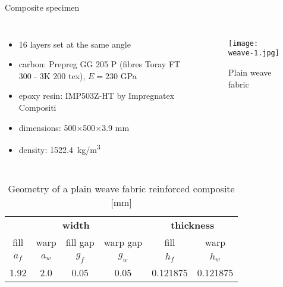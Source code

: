\documentclass[10pt,aspectratio=169,dvipsnames]{beamer} %
\newcounter{angle}
\begin{document}
	\begin{frame}[t]{Composite specimen}
		\begin{columns}[T]
			{\small
				\begin{itemize}
					\item 16 layers set at the same angle \\
					\item carbon: Prepreg GG 205 P (fibres Toray FT 300 - 3K 200 tex), $E=230$ GPa
					\item epoxy resin: IMP503Z-HT by Impregnatex Compositi 
					\item dimensions: 500$\times$500$\times$3.9 mm\\
					\item density: 1522.4~kg/m\textsuperscript{3}
				\end{itemize}
			}
			\begin{figure}
				\texttt{[image: weave-1.jpg]}
				\caption{Plain weave fabric}
			\end{figure}
		\end{columns}
		\begin{table}[h]
			\renewcommand{\arraystretch}{1.1}
			\centering \footnotesize
			\caption{Geometry of a plain weave fabric reinforced composite [mm]}
			\begin{tabular}{cccccc} 
				\toprule[1.5pt]
				\multicolumn{4}{c}{\textbf{width} }	& \multicolumn{2}{c}{\textbf{thickness} }\\ 
				\cmidrule(lr){1-4} \cmidrule(lr){5-6} 
				fill & warp & fill gap& warp gap& fill & warp\\
				$a_f$ &$a_w$& $g_f$ & $g_w$ & $h_f$& $h_w$ \\ 
				\cmidrule(lr){1-2} \cmidrule(lr){3-4} \cmidrule(lr){5-6}
				1.92 &2.0& 0.05& 0.05 & 0.121875 & 0.121875 \\
				\bottomrule[1.5pt] 
			\end{tabular} 
			\label{tab:weave_geo}
		\end{table}
	\end{frame}
\end{document}
